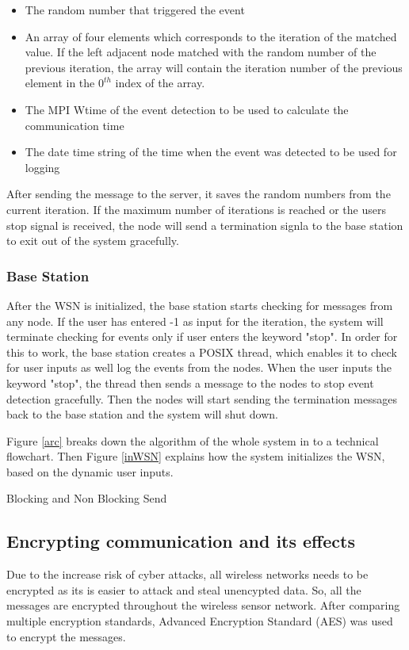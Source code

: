 \documentclass[conference]{IEEEtran}
\begin{document}
		\begin{itemize}
		\item The random number that triggered the event
		\item An array of four elements which corresponds to the iteration of the matched value. If the left adjacent node matched with the random number of the previous iteration, the array will contain the iteration number of the previous element in the $0^{th}$ index of the array. 
		\item The MPI Wtime of the event detection to be used to calculate the communication time
		\item The date time string of the time when the event was detected to be used for logging
	\end{itemize}
	
	After sending the message to the server, it saves the random numbers from the current iteration. If the maximum number of iterations is reached or the users stop signal is received, the node will send a termination signla to the base station to exit out of the system gracefully.
	

	\subsubsection{Base Station}
	After the WSN is initialized, the base station starts checking for messages from any node. If the user has entered -1 as input for the iteration, the system will terminate checking for events only if user enters the keyword "stop". In order for this to work, the base station creates a POSIX thread, which enables it to check for user inputs as well log the events from the nodes. When the user inputs the keyword "stop", the thread then sends a message to the nodes to stop event detection gracefully. Then the nodes will start sending the termination messages back to the base station and the system will shut down.
	
	Figure \ref{arc} breaks down the algorithm of the whole system in to a technical flowchart. Then Figure \ref{inWSN} explains how the system initializes the WSN, based on the dynamic user inputs.
	
	
	Blocking and Non Blocking Send
	
	
	\subsection{ Encrypting communication and its effects }\label{encryption}
	
	Due to the increase risk of cyber attacks, all wireless networks needs to be encrypted as its is easier to attack and steal unencypted data. So, all the messages are encrypted throughout the wireless sensor network. After comparing multiple encryption standards, Advanced Encryption Standard (AES) was used to encrypt the messages.
	
\end{document}
